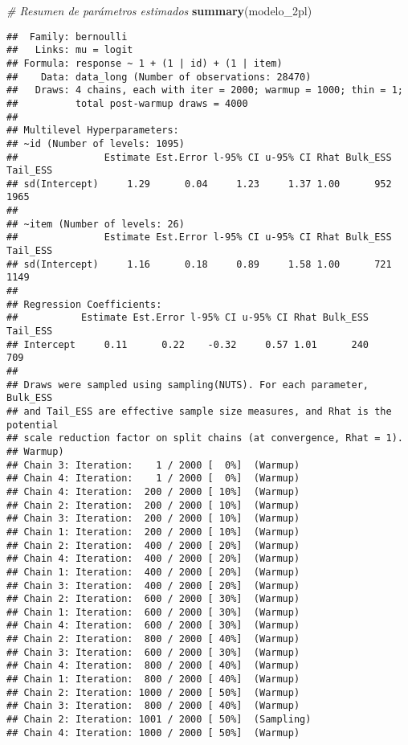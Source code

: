 \documentclass[
]{article}
\newenvironment{Shaded}{\begin{snugshade}}{\end{snugshade}}
\newcommand{\CommentTok}[1]{\textcolor[rgb]{0.56,0.35,0.01}{\textit{#1}}}
\newcommand{\FunctionTok}[1]{\textcolor[rgb]{0.13,0.29,0.53}{\textbf{#1}}}
\newcommand{\NormalTok}[1]{#1}
\begin{document}
\begin{Shaded}
\begin{Highlighting}[]
\CommentTok{\# Resumen de parámetros estimados}
\FunctionTok{summary}\NormalTok{(modelo\_2pl)}
\end{Highlighting}
\end{Shaded}

\begin{verbatim}
##  Family: bernoulli 
##   Links: mu = logit 
## Formula: response ~ 1 + (1 | id) + (1 | item) 
##    Data: data_long (Number of observations: 28470) 
##   Draws: 4 chains, each with iter = 2000; warmup = 1000; thin = 1;
##          total post-warmup draws = 4000
## 
## Multilevel Hyperparameters:
## ~id (Number of levels: 1095) 
##               Estimate Est.Error l-95% CI u-95% CI Rhat Bulk_ESS Tail_ESS
## sd(Intercept)     1.29      0.04     1.23     1.37 1.00      952     1965
## 
## ~item (Number of levels: 26) 
##               Estimate Est.Error l-95% CI u-95% CI Rhat Bulk_ESS Tail_ESS
## sd(Intercept)     1.16      0.18     0.89     1.58 1.00      721     1149
## 
## Regression Coefficients:
##           Estimate Est.Error l-95% CI u-95% CI Rhat Bulk_ESS Tail_ESS
## Intercept     0.11      0.22    -0.32     0.57 1.01      240      709
## 
## Draws were sampled using sampling(NUTS). For each parameter, Bulk_ESS
## and Tail_ESS are effective sample size measures, and Rhat is the potential
## scale reduction factor on split chains (at convergence, Rhat = 1).
## Warmup)
## Chain 3: Iteration:    1 / 2000 [  0%]  (Warmup)
## Chain 4: Iteration:    1 / 2000 [  0%]  (Warmup)
## Chain 4: Iteration:  200 / 2000 [ 10%]  (Warmup)
## Chain 2: Iteration:  200 / 2000 [ 10%]  (Warmup)
## Chain 3: Iteration:  200 / 2000 [ 10%]  (Warmup)
## Chain 1: Iteration:  200 / 2000 [ 10%]  (Warmup)
## Chain 2: Iteration:  400 / 2000 [ 20%]  (Warmup)
## Chain 4: Iteration:  400 / 2000 [ 20%]  (Warmup)
## Chain 1: Iteration:  400 / 2000 [ 20%]  (Warmup)
## Chain 3: Iteration:  400 / 2000 [ 20%]  (Warmup)
## Chain 2: Iteration:  600 / 2000 [ 30%]  (Warmup)
## Chain 1: Iteration:  600 / 2000 [ 30%]  (Warmup)
## Chain 4: Iteration:  600 / 2000 [ 30%]  (Warmup)
## Chain 2: Iteration:  800 / 2000 [ 40%]  (Warmup)
## Chain 3: Iteration:  600 / 2000 [ 30%]  (Warmup)
## Chain 4: Iteration:  800 / 2000 [ 40%]  (Warmup)
## Chain 1: Iteration:  800 / 2000 [ 40%]  (Warmup)
## Chain 2: Iteration: 1000 / 2000 [ 50%]  (Warmup)
## Chain 3: Iteration:  800 / 2000 [ 40%]  (Warmup)
## Chain 2: Iteration: 1001 / 2000 [ 50%]  (Sampling)
## Chain 4: Iteration: 1000 / 2000 [ 50%]  (Warmup)

\end{verbatim}
\end{document}
